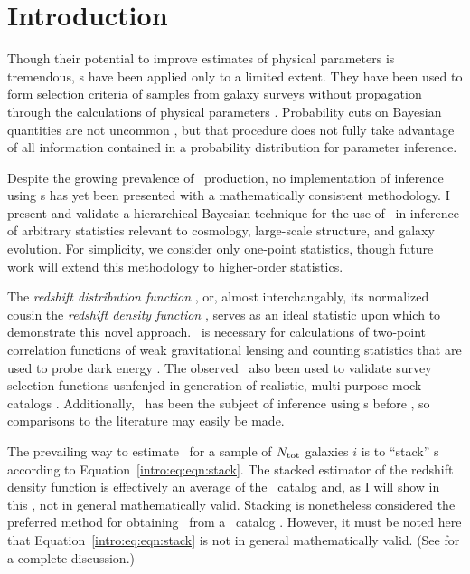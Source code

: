 \section{Introduction}

Though their potential to improve estimates of physical parameters is tremendous, \pzpdf s have been applied only to a limited extent.  
They have been used to form selection criteria of samples from galaxy surveys without propagation 
through the calculations of physical parameters \citep{VanBreukelen2009,Viironen2015}.  
Probability cuts on Bayesian quantities are not uncommon \citep{Leung2015, DiPompeo2015a}, but that procedure does not fully take advantage of all information contained in a probability distribution for parameter inference.  

Despite the growing prevalence of \pzpdf\ production, no implementation of inference using \pzpdf s has yet been presented with a mathematically consistent methodology.  
I present and validate a hierarchical Bayesian technique for the use of \pzpdf\ in inference of arbitrary statistics relevant to cosmology, large-scale structure, and galaxy evolution.  
For simplicity, we consider only one-point statistics, though future work will extend this methodology to higher-order statistics.

The \textit{redshift distribution function \Nz}, or, almost interchangably, its normalized cousin the \textit{redshift density function \nz}, serves as an ideal statistic upon which to demonstrate this novel approach.  
\Nz\ is necessary for calculations of two-point correlation functions of weak gravitational lensing and counting statistics that are used to probe dark energy \citep{Masters2015}.  
The observed \Nz\ also been used to validate survey selection functions usnfenjed in generation of realistic, multi-purpose mock catalogs \citep{Norberg2002}.  
Additionally, \Nz\ has been the subject of inference using \pzpdf s before \citep{sheldon_photometric_2012, Hildebrandt2012, Kelly2014, Benjamin2013, bonnett_using_2015, Viironen2015, Asorey2016, leistedt_hierarchical_2016}, so comparisons to the literature may easily be made. 

The prevailing way to estimate \nz\ for a sample of $N_{\mathrm{tot}}$ galaxies $i$ is to ``stack'' \pzpdf s according to Equation~\ref{intro:eq:eqn:stack}.
The stacked estimator of the redshift density function is effectively an average of the \pzpdf\ catalog and, as I will show in this \paper, not in general mathematically valid.
Stacking is nonetheless considered the preferred method for obtaining \Nz\ from a \pzpdf\ catalog \citep{sheldon_photometric_2012, Kelly2014, Benjamin2013, bonnett_using_2015, Viironen2015, Asorey2016}.  
However, it must be noted here that Equation~\ref{intro:eq:eqn:stack} is not in general mathematically valid.  
(See \citet{Hogg2012} for a complete discussion.)  


